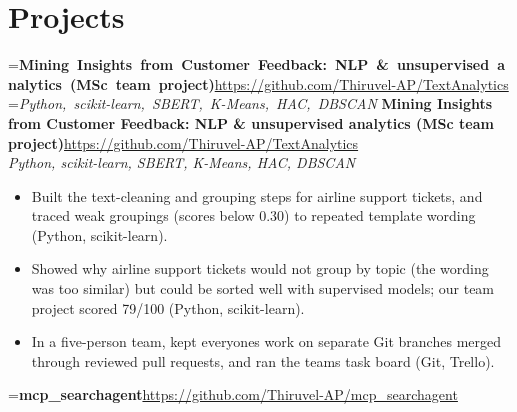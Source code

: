 \documentclass[a4paper,11pt]{article}
\newcommand{\project}[3]{%
  \textbf{#1}\hfill#3\\ {\color{muted}\small\textit{#2}}\par}
\newcommand{\gap}{\vspace{5pt}}
\begin{document}
\section{Projects}
=\hbox{\textbf{Mining Insights from Customer Feedback: NLP \& unsupervised analytics (MSc team project)}\hspace{1em}\url{https://github.com/Thiruvel-AP/TextAnalytics}}%
=\hbox{{\small\textit{Python, scikit-learn, SBERT, K-Means, HAC, DBSCAN}}}%
\ifdim\wd0>\linewidth
\ifdim\wd2>\linewidth
\textbf{Mining Insights from Customer Feedback: NLP \& unsupervised analytics (MSc team project)}\\ {\color{muted}\small\textit{Python, scikit-learn, SBERT, K-Means, HAC, DBSCAN}}\\ \hspace*{\fill}{\small\url{https://github.com/Thiruvel-AP/TextAnalytics}}\par
\else
\textbf{Mining Insights from Customer Feedback: NLP \& unsupervised analytics (MSc team project)}\\ {\color{muted}\small\textit{Python, scikit-learn, SBERT, K-Means, HAC, DBSCAN}}\hfill{\small\url{https://github.com/Thiruvel-AP/TextAnalytics}}\par
\fi
\else
\project{Mining Insights from Customer Feedback: NLP \& unsupervised analytics (MSc team project)}{Python, scikit-learn, SBERT, K-Means, HAC, DBSCAN}{\url{https://github.com/Thiruvel-AP/TextAnalytics}}
\fi
\begin{itemize}
  \item Built the text-cleaning and grouping steps for airline support tickets, and traced weak groupings (scores below 0.30) to repeated template wording (Python, scikit-learn).
  \item Showed why airline support tickets would not group by topic (the wording was too similar) but could be sorted well with supervised models; our team project scored 79/100 (Python, scikit-learn).
  \item In a five-person team, kept everyone\textquotesingle{}s work on separate Git branches merged through reviewed pull requests, and ran the team\textquotesingle{}s task board (Git, Trello).
\end{itemize}
\gap
{}
=\hbox{\textbf{mcp\_searchagent}\hspace{1em}\url{https://github.com/Thiruvel-AP/mcp_searchagent}}%
\end{document}
